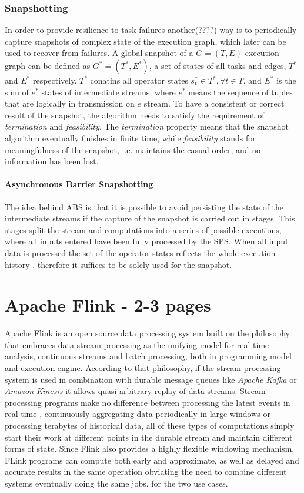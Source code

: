\subsubsection{Snapshotting}
In order to provide resilience to task failures another(????) way is to periodically capture snapshots of complex state of the execution graph, which later can be used to recover from failures. A global snapshot\cite{abs} of a $G = (T,E)$ execution graph can be defined as $G^{*} = (T^{*},E^{*})$, a set of states of all tasks and edges, $T^{*}$ and $E^{*}$ respectively. $T^{*}$ conatins all operator states $s^{*}_{t} \in T^{*}, \forall t \in T$, and $E^{*}$ is the sum of $e^{*}$ states of intermediate streams, where $e^{*}$ means the sequence of tuples that are logically in transmission on $e$ stream. To have a consistent or correct result of the snapshot, the algorithm needs to satisfy the requirement of \textit{termination} and \textit{feasibility}.
The \textit{termination} property means that the snapshot algorithm eventually finishes in finite time, while \textit{feasibility} stands for meaningfulness of the snapshot, i.e. maintains the casual order, and no information has been lost. 

\paragraph{Asynchronous Barrier Snapshotting}\cite{abs}\label{abs} The idea behind ABS is that it is possible to avoid persisting the state of the intermediate streams if the capture of the snapshot is carried out in stages. This stages split the stream and computations into a series of possible executions, where all inputs entered have been fully processed by the SPS. When all input data is processed the set of the operator states reflects the whole execution history , therefore it suffices to be solely used for the snapshot.



\section{Apache Flink - 2-3 pages}
Apache Flink is an open source data processing system built on the philosophy that embraces  data stream processing as the unifying model for real-time analysis, continuous streams and batch processing, both in  programming model and execution engine. 
According to that philosophy, if the stream processing system is used in combination with durable message queues like \textit{Apache Kafka} or \textit{Amazon Kinesis}  
it allows quasi arbitrary replay of data streams. Stream processing programs make no difference between processing the latest events in real-time , 
continuously aggregating data periodically in large windows or processing terabytes of historical data, all of these types of computations  simply start their work at 
different points in the durable stream and maintain different forms of state. Since Flink also provides a highly flexible windowing mechanism, 
FLink programs can compute both early and approximate, as well as delayed and accurate results in the same operation obviating the need to combine different systems eventually doing the same jobs. 
for the two use cases.

